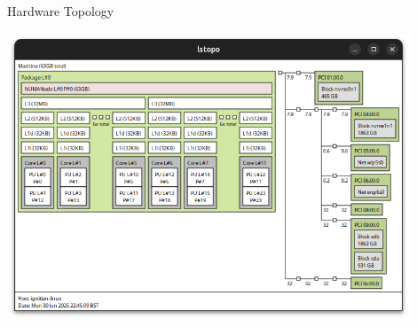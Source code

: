 \documentclass{beamer}
\begin{document}
\begin{frame}{Hardware Topology}
    \begin{center}
        \includegraphics[width=0.9\textwidth]{images/lstopo.png}
    \end{center}
\end{frame}
\end{document}
